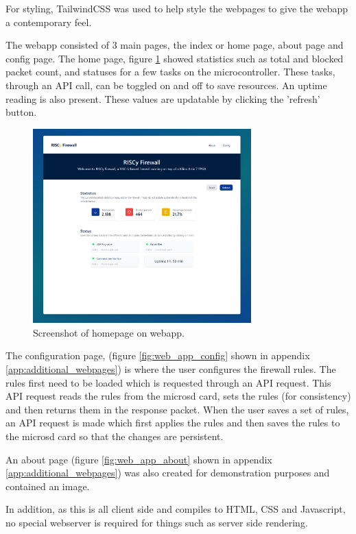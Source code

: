 For styling, TailwindCSS was used to help style the webpages to give the webapp a contemporary feel. 

The webapp consisted of 3 main pages, the index or home page, about page and config page. The home page, figure \ref{fig:webapp_home} showed statistics such as total and blocked packet count, and statuses for a few tasks on the microcontroller. These tasks, through an API call, can be toggled on and off to save resources. An uptime reading is also present. These values are updatable by clicking the 'refresh' button.

\begin{figure}[h!]
    \centering
    \includegraphics[width=0.75\textwidth]{Images/homepage_small.png}
    \caption[Screenshot of homepage on webapp]{Screenshot of homepage on webapp.}
    \label{fig:webapp_home}
\end{figure}

The configuration page, (figure \ref{fig:web_app_config} shown in appendix \ref{app:additional_webpages}) is where the user configures the firewall rules. The rules first need to be loaded which is requested through an API request. This API request reads the rules from the microsd card, sets the rules (for consistency) and then returns them in the response packet. When the user saves a set of rules, an API request is made which first applies the rules and then saves the rules to the microsd card so that the changes are persistent. 

An about page (figure \ref{fig:web_app_about} shown in appendix \ref{app:additional_webpages}) was also created for demonstration purposes and contained an image.

In addition, as this is all client side and compiles to HTML, CSS and Javascript, no special webserver is required for things such as server side rendering.


